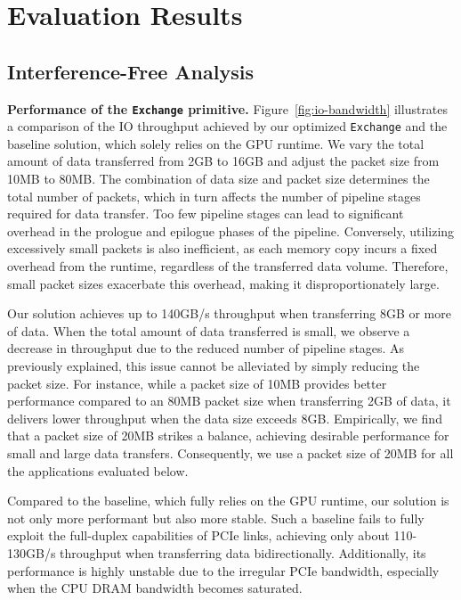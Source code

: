 \section{Evaluation Results} \label{section:restuls}

\subsection{Interference-Free Analysis}
\noindent
\textbf{Performance of the \texttt{Exchange} primitive.}
Figure~\ref{fig:io-bandwidth} illustrates a comparison of the IO throughput achieved by our optimized \texttt{Exchange} and the baseline solution, which solely relies on the GPU runtime. 
We vary the total amount of data transferred from 2GB to 16GB and adjust the packet size from 10MB to 80MB. 
The combination of data size and packet size determines the total number of packets, which in turn affects the number of pipeline stages required for data transfer. 
Too few pipeline stages can lead to significant overhead in the prologue and epilogue phases of the pipeline. 
Conversely, utilizing excessively small packets is also inefficient, as each memory copy incurs a fixed overhead from the runtime, regardless of the transferred data volume. 
Therefore, small packet sizes exacerbate this overhead, making it disproportionately large.

Our solution achieves up to 140GB/s throughput when transferring 8GB or more of data. 
When the total amount of data transferred is small, we observe a decrease in throughput due to the reduced number of pipeline stages. 
As previously explained, this issue cannot be alleviated by simply reducing the packet size. 
For instance, while a packet size of 10MB provides better performance compared to an 80MB packet size when transferring 2GB of data, it delivers lower throughput when the data size exceeds 8GB. 
Empirically, we find that a packet size of 20MB strikes a balance, achieving desirable performance for small and large data transfers.
Consequently, we use a packet size of 20MB for all the applications evaluated below.

Compared to the baseline, which fully relies on the GPU runtime, our solution is not only more performant but also more stable. 
Such a baseline fails to fully exploit the full-duplex capabilities of PCIe links, achieving only about 110-130GB/s throughput when transferring data bidirectionally. 
Additionally, its performance is highly unstable due to the irregular PCIe bandwidth, especially when the CPU DRAM bandwidth becomes saturated.

